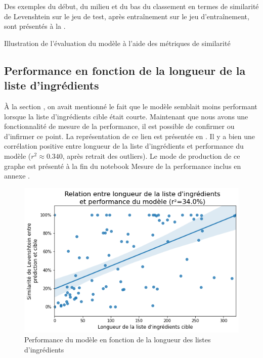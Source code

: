             Des exemples du début, du milieu et du bas du classement en termes de similarité de Levenshtein sur le jeu de test, après entraînement sur le jeu d'entraînement, sont présentés à la .
            \begin{table}[htbp]
                \begin{spacing}{1.0}
                \begin{center}
                {\tiny
                
                }
                \caption{Illustration de l'évaluation du modèle à l'aide des métriques de similarité}
                \label{tbl:similarity_illustration}
                \end{center}
                \end{spacing}
            \end{table}

        \subsection{Performance en fonction de la longueur de la liste d'ingrédients}

        \`{A} la section , on avait mentionné le fait que le modèle semblait moins performant lorsque la liste d'ingrédients cible était courte.
        Maintenant que nous avons une fonctionnalité de mesure de la performance, il est possible de confirmer ou d'infirmer ce point.
        La représentation de ce lien est présentée en .
        Il y a bien une corrélation positive entre longueur de la liste d'ingrédients et performance du modèle ($r^{2} \approx 0.340$, après retrait des outliers).
        Le mode de production de ce graphe est présenté à la fin du notebook \og Mesure de la performance \fg inclus en annexe .
        \begin{figure}[htbp]
            \begin{center}
            \includegraphics[width=0.7\linewidth]{img/perf_vs_length.png}
            \end{center}
            \caption{Performance du modèle en fonction de la longueur des listes d'ingrédients}
            \label{fig:perf_vs_length}
        \end{figure}

